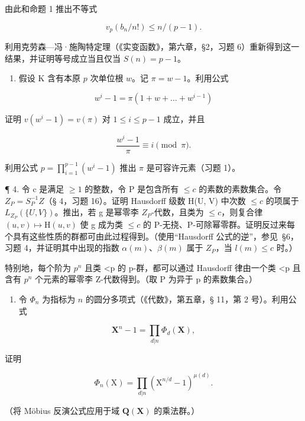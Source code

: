 由此和命题 1 推出不等式

\[
v _ {p} (b _ {n} / n!) \leqslant n / (p - 1).
\]

利用克劳森—冯·施陶特定理（《实变函数》，第六章，§2，习题 6）重新得到这一结果，并证明等号成立当且仅当 \(S(n) = p - 1\)。

\begin{enumerate}
\def\labelenumi{\arabic{enumi}.}
\setcounter{enumi}{2}
\tightlist
\item
  假设 K 含有本原 \(p\) 次单位根 \(w\)。记 \(\pi = w - 1\)。利用公式
\end{enumerate}

\[
w ^ {i} - 1 = \pi (1 + w + \dots + w ^ {i - 1})
\]

证明 \(v(w^{i} - 1) = v(\pi)\) 对 \(1 \leqslant i \leqslant p - 1\) 成立，并且

\[
\frac {w ^ {i} - 1}{\pi} \equiv i \pmod {\pi}.
\]

利用公式 \(p = \prod_{i=1}^{p-1} (w^i - 1)\) 推出 \(\pi\) 是可容许元素（习题 1）。

¶ 4. 令 c 是满足 \(\geqslant1\) 的整数，令 P 是包含所有 \(\leqslant c\) 的素数的素数集合。令 \(Z_{P}=S_{P}^{-1}Z\)（§ 4，习题 16）。证明 Hausdorff 级数 H(U, V) 中次数 \(\leqslant c\) 的项属于 \(L_{Z_{P}}(\{U, V\})\)。推出，若 g 是幂零李 \(Z_{P}\)-代数，且类为 \(\leqslant c\)，则复合律 \((u,v)\mapsto\mathrm{H}(u,v)\) 使 g 成为类 \(\leqslant c\) 的 P-无挠、P-可除幂零群。证明反过来每个具有这些性质的群都可由此过程得到。（使用“Hausdorff 公式的逆”，参见~§6，习题 4，并证明其中出现的指数 \(\alpha(m)\)、\(\beta(m)\) 属于 \(Z_{P}\)，当 \(l(m)\leqslant c\) 时。）

特别地，每个阶为 \(p^{n}\) 且类 \textless p 的 p-群，都可以通过 Hausdorff 律由一个类 \textless p 且含有 \(p^{n}\) 个元素的幂零李 Z-代数得到。（取 P 为异于 p 的素数集合。）

\exercisesforappendix

\begin{enumerate}
\def\labelenumi{\arabic{enumi}.}
\tightlist
\item
  令 \(\Phi_n\) 为指标为 \(n\) 的圆分多项式（《代数》，第五章，§ 11，第 2 号）。利用公式
\end{enumerate}

\[
\mathbf {X} ^ {n} - 1 = \prod_ {d | n} \Phi_ {d} (\mathbf {X}),
\]

证明

\[
\Phi_ {n} (\mathrm{X}) = \prod_ {d | n} \left(\mathrm{X} ^ {n / d} - 1\right) ^ {\mu (d)}.
\]

（将 Möbius 反演公式应用于域 \(\mathbf{Q}(\mathbf{X})\) 的乘法群。）

